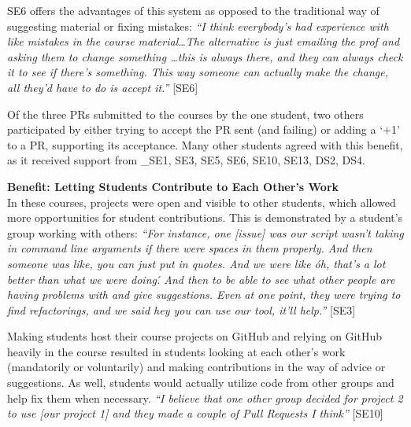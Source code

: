 SE6 offers the advantages of this system as opposed to the traditional way of suggesting material or fixing mistakes: \textit{``I think everybody's had experience with like mistakes in the course material\ldots The alternative is just emailing the prof and asking them to change something \ldots this is always there, and they can always check it to see if there's something. This way someone can actually make the change, all they'd have to do is accept it.''} [SE6]

Of the three PRs submitted to the courses by the one student, two others participated by either trying to accept the PR sent (and failing) or adding a `+1' to a PR, supporting its acceptance. Many other students agreed with this benefit, as it received support from _{SE1, SE3, SE5, SE6, SE10, SE13, DS2, DS4}. %


\textbf{Benefit: Letting Students Contribute to Each Other's Work} \\
In these courses, projects were open and visible to other students, which allowed more opportunities for student contributions. This is demonstrated by a student's group working with others:
\textit{``For instance, one [issue] was our script wasn't taking in command line arguments if there were spaces in them properly. And then someone was like, you can just put in quotes. And we were like \'oh, that's a lot better than what we were doing\'. And then to be able to see what other people are having problems with and give suggestions. Even at one point, they were trying to find refactorings, and we said hey you can use our tool, it'll help.''} [SE3]

Making students host their course projects on GitHub and relying on GitHub heavily in the course resulted in students looking at each other's work (mandatorily or voluntarily) and making contributions in the way of advice or suggestions. As well, students would actually utilize code from other groups and help fix them when necessary. \textit{``I believe that one other group decided for project 2 to use [our project 1] and they made a couple of Pull Requests I think''} [SE10]

